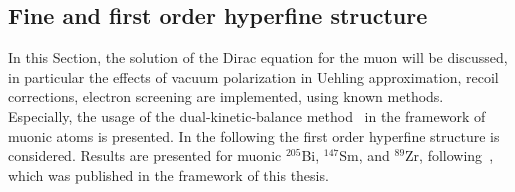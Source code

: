 \subsection{Fine and first order hyperfine structure}
\label{sec:muon_finestructure}
In this Section, the solution of the Dirac equation for the muon will be discussed, in particular the effects of vacuum polarization in Uehling approximation, recoil corrections, electron screening are implemented, using known methods. Especially, the usage of the dual-kinetic-balance method~\cite{Shabaev2004} in the framework of muonic atoms is presented. In the following the first order hyperfine structure is considered. Results are presented for muonic $^{205}$Bi, $^{147}$Sm, and $^{89}$Zr, following~\cite{michel2017}, which was published in the framework of this thesis.

